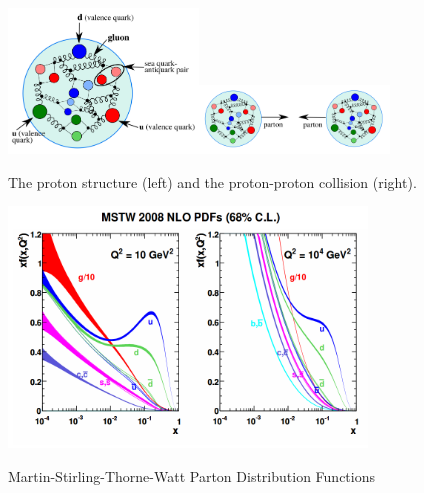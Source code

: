 \begin{figure}[htb]
  \begin{center}
    {\includegraphics[width=0.45\textwidth]{../figs/Intro/protonStructure.png}\includegraphics[width=0.45\textwidth]{../figs/Intro/ppCollision.png}}
    \caption{The proton structure (left) and the proton-proton collision (right).}
    \label{fig:ppCollision}
  \end{center}
\end{figure}

\begin{figure}[htb]
  \begin{center}
    {\includegraphics[width=0.85\textwidth]{../figs/Intro/pdfs.png}}
    \caption{Martin-Stirling-Thorne-Watt Parton Distribution Functions \cite{ref_fig_pdfs}}
    \label{fig:pdfs}
  \end{center}
\end{figure}



